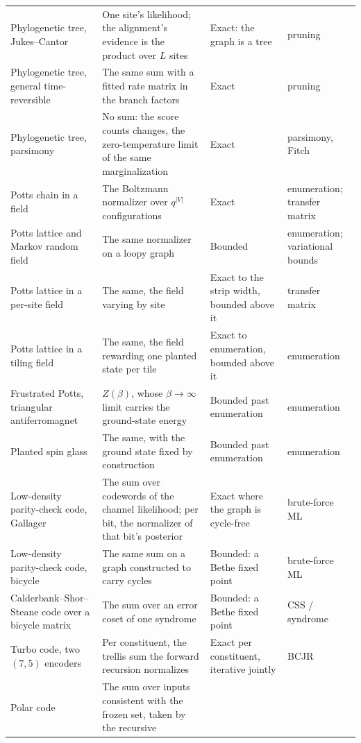 \documentclass[11pt,a4paper]{article}
\begin{document}
\begin{longtable}{@{}p{}p{}p{}p{}@{}}
  Phylogenetic tree, Jukes--Cantor
  & One site's likelihood; the alignment's evidence is the product over $L$
    sites
  & Exact: the graph is a tree
  & pruning \\
  Phylogenetic tree, general time-reversible
  & The same sum with a fitted rate matrix in the branch factors
  & Exact
  & pruning \\
  Phylogenetic tree, parsimony
  & No sum: the score counts changes, the zero-temperature limit of the same
    marginalization
  & Exact
  & parsimony, Fitch \\
  Potts chain in a field
  & The Boltzmann normalizer over $q^{|V|}$ configurations
  & Exact
  & enumeration; transfer matrix \\
  Potts lattice and Markov random field
  & The same normalizer on a loopy graph
  & Bounded
  & enumeration; variational bounds \\
  Potts lattice in a per-site field
  & The same, the field varying by site
  & Exact to the strip width, bounded above it
  & transfer matrix \\
  Potts lattice in a tiling field
  & The same, the field rewarding one planted state per tile
  & Exact to enumeration, bounded above it
  & enumeration \\
  Frustrated Potts, triangular antiferromagnet
  & $Z(\beta)$, whose $\beta \to \infty$ limit carries the ground-state energy
  & Bounded past enumeration
  & enumeration \\
  Planted spin glass
  & The same, with the ground state fixed by construction
  & Bounded past enumeration
  & enumeration \\
  Low-density parity-check code, Gallager
  & The sum over codewords of the channel likelihood; per bit, the normalizer
    of that bit's posterior
  & Exact where the graph is cycle-free
  & brute-force ML \\
  Low-density parity-check code, bicycle
  & The same sum on a graph constructed to carry cycles
  & Bounded: a Bethe fixed point
  & brute-force ML \\
  Calderbank--Shor--Steane code over a bicycle matrix
  & The sum over an error coset of one syndrome
  & Bounded: a Bethe fixed point
  & CSS / syndrome \\
  Turbo code, two $(7,5)$ encoders
  & Per constituent, the trellis sum the forward recursion normalizes
  & Exact per constituent, iterative jointly
  & BCJR \\
  Polar code
  & The sum over inputs consistent with the frozen set, taken by the recursive

\end{longtable}
\end{document}
